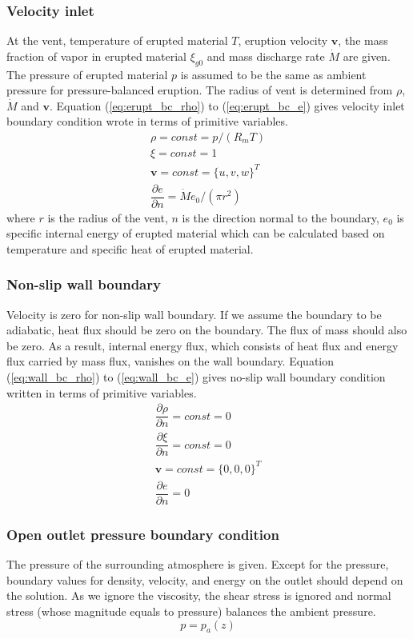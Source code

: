 \documentclass[gmd, manuscript]{copernicus}
\begin{document}
\subsubsection{Velocity inlet}
At the vent, temperature of erupted material $T$, eruption velocity $\textbf{v}$, the mass fraction of vapor in erupted material $\xi_{g0}$ and mass discharge rate $\dot M$ are given. The pressure of erupted material $p$ is assumed to be the same as ambient pressure for pressure-balanced eruption. The radius of vent is determined from $\rho$, $\dot M$ and $\textbf{v}$. Equation (\ref{eq:erupt_bc_rho}) to (\ref{eq:erupt_bc_e}) gives velocity inlet boundary condition wrote in terms of primitive variables.
\begin{align}
\rho =const = p/\left(R_m T\right) \label{eq:erupt_bc_rho} \\
\xi=const=1 \label{eq:erupt_bc_xi}\\
\textbf{v} = const =\{u,v,w\}^T \label{eq:erupt_bc_v}\\
\dfrac{\partial e}{\partial n}=\dot M e_0 /\left(\pi r^2\right) \label{eq:erupt_bc_e}
\end{align} 
where $r$ is the radius of the vent, $n$ is the direction normal to the boundary, $e_0$ is specific internal energy of erupted material which can be calculated based on temperature and specific heat of erupted material.

\subsubsection{Non-slip wall boundary}
Velocity is zero for non-slip wall boundary. If we assume the boundary to be adiabatic, heat flux should be zero on the boundary. The flux of mass should also be zero. As a result, internal energy flux, which consists of heat flux and energy flux carried by mass flux, vanishes on the wall boundary. Equation (\ref{eq:wall_bc_rho}) to (\ref{eq:wall_bc_e}) gives no-slip wall boundary condition written in terms of primitive variables.
\begin{align}
\dfrac{\partial \rho}{\partial n} = const = 0\label{eq:wall_bc_rho} \\
\dfrac{\partial \xi}{\partial n} = const = 0 \label{eq:wall_bc_xi}\\ 
\textbf{v} = const =\{0,0,0\}^T \label{eq:wall_bc_v}\\
\dfrac{\partial e }{\partial n} = 0\label{eq:wall_bc_e}
\end{align} 

\subsubsection{Open outlet pressure boundary condition}
The pressure of the surrounding atmosphere is given. Except for the pressure, boundary values for density, velocity, and energy on the outlet should depend on the solution. As we ignore the viscosity, the shear stress is ignored and normal stress (whose magnitude equals to pressure) balances the ambient pressure.
\begin{equation}
p = p_a\left(z\right)  \label{eq:pressure_bc_p} 
\end{equation} 
\end{document}
